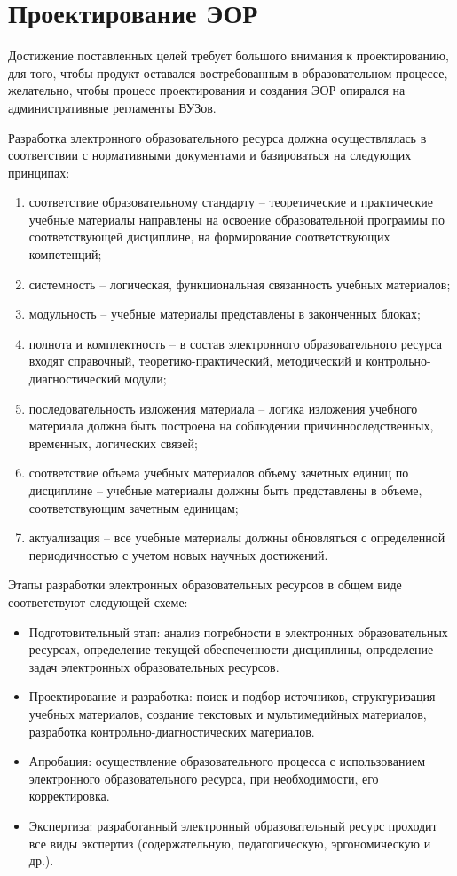 \section{Проектирование ЭОР}
Достижение поставленных целей требует большого внимания к проектированию, для того, чтобы продукт оставался востребованным в образовательном процессе, желательно, чтобы процесс проектирования и создания ЭОР опирался на административные регламенты ВУЗов\cite{shevardina}.

Разработка электронного образовательного ресурса должна осуществлялась в соответствии с нормативными документами и базироваться на следующих принципах:
\begin{enumerate}
\item соответствие образовательному стандарту – теоретические и практические учебные материалы направлены на освоение образовательной программы по соответствующей дисциплине, на формирование соответствующих компетенций;
\item системность – логическая, функциональная связанность учебных материалов;
\item модульность – учебные материалы представлены в законченных блоках;
\item полнота и комплектность – в состав электронного образовательного ресурса входят справочный, теоретико-практический, методический и контрольно-диагностический модули;
\item последовательность изложения материала – логика изложения учебного материала должна быть построена на соблюдении причинноследственных, временных, логических связей;
\item соответствие объема учебных материалов объему зачетных единиц по дисциплине – учебные материалы должны быть представлены в объеме, соответствующим зачетным единицам;
\item актуализация – все учебные материалы должны обновляться с определенной периодичностью с учетом новых научных достижений.
\end{enumerate}

Этапы разработки электронных образовательных ресурсов в общем виде соответствуют следующей схеме:
\begin{itemize}
\item Подготовительный этап: анализ потребности в электронных образовательных ресурсах, определение текущей обеспеченности дисциплины, определение задач электронных образовательных ресурсов.
\item Проектирование и разработка: поиск и подбор источников, структуризация учебных материалов, создание текстовых и мультимедийных материалов, разработка контрольно-диагностических материалов.
\item Апробация: осуществление образовательного процесса с использованием электронного образовательного ресурса, при необходимости, его корректировка.
\item Экспертиза: разработанный электронный образовательный ресурс проходит все виды экспертиз (содержательную, педагогическую, эргономическую и др.).
\end{itemize}